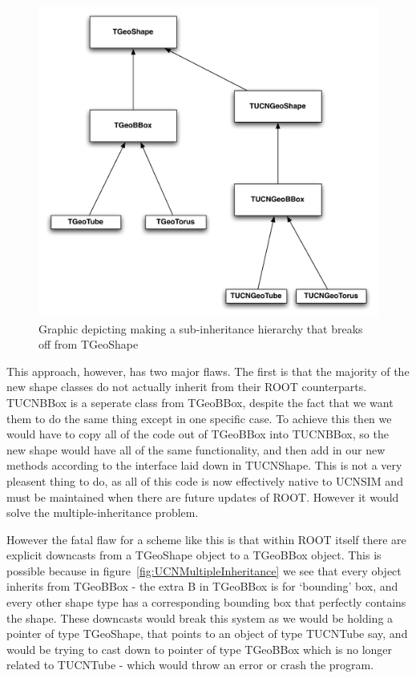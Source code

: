 \documentclass[11pt,a4paper,oneside]{article}
\begin{document}
\begin{figure}[!htbp] 
\begin{center}
\includegraphics[scale=0.5]{designdocumentimages/MultipleInheritance2}
\end{center}
\caption{Graphic depicting making a sub-inheritance hierarchy that breaks off from TGeoShape}
\label{fig:UCNMultipleInheritance2}
\end{figure}

This approach, however, has two major flaws. The first is that the majority of the new shape classes do not actually inherit from their ROOT counterparts. TUCNBBox is a seperate class from TGeoBBox, despite the fact that we want them to do the same thing except in one specific case. To achieve this then we would have to copy all of the code out of TGeoBBox into TUCNBBox, so the new shape would have all of the same functionality, and then add in our new methods according to the interface laid down in TUCNShape. This is not a very pleasent thing to do, as all of this code is now effectively native to UCNSIM and must be maintained when there are future updates of ROOT. However it would solve the multiple-inheritance problem. 

However the fatal flaw for a scheme like this is that within ROOT itself there are explicit downcasts from a TGeoShape object to a TGeoBBox object. This is possible because in figure~\ref{fig:UCNMultipleInheritance} we see that every object inherits from TGeoBBox - the extra B in TGeoBBox is for `bounding' box, and every other shape type has a corresponding bounding box that perfectly contains the shape. These downcasts would break this system as we would be holding a pointer of type TGeoShape, that points to an object of type TUCNTube say, and would be trying to cast down to pointer of type TGeoBBox which is no longer related to TUCNTube - which would throw an error or crash the program. 
\end{document}
